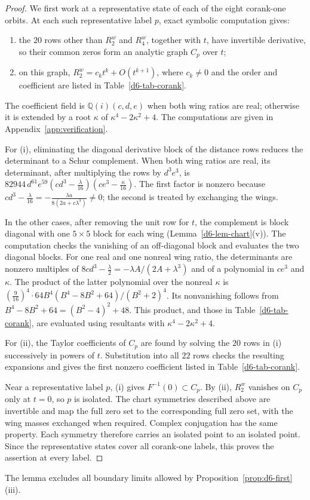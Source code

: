 \documentclass[Threeside,11pt]{article}
\theoremstyle{definition}
\theoremstyle{remark}
\numberwithin{equation}{section}
\theoremstyle{remark}
\newenvironment{romanlist}{\begin{enumerate}\renewcommand{\labelenumi}{(\roman{enumi})}%
  \renewcommand{\theenumi}{\roman{enumi}}}{\end{enumerate}}
\begin{document}
{
\begin{proof}
We first work at a representative state of each of the eight corank-one orbits.
At each such representative label $p$, exact symbolic computation gives:
\begin{romanlist}
  \item the $20$ rows other than $R^w_2$ and $R^w_4$, together with $t$, have
  invertible derivative, so their common zeros form an analytic graph $C_p$ over $t$;
  \item on this graph, $R^w_2=c_kt^k+O(t^{k+1})$, where $c_k\ne0$ and the
  order and coefficient are listed in Table~\ref{d6-tab-corank}.
\end{romanlist}
The coefficient field is $\mathbb Q(i)(c,d,e)$ when both wing ratios are real;
otherwise it is extended by a root $\kappa$ of $\kappa^4-2\kappa^2+4$.
The computations are given in Appendix~\ref{app:verification}.

For (i), eliminating the diagonal derivative block of the distance rows
reduces the determinant to a Schur complement.
When both wing ratios are real, its determinant, after multiplying the
rows by $d^3e^3$, is
$82944\,d^{61}e^{59}(cd^3-\frac{\lambda}{16})(ce^3-\frac{\kappa}{16})$.
The first factor is nonzero because
$cd^3-\frac{\lambda}{16}=-\frac{\lambda a}{8(2a+c\lambda^3)}\ne0$;
the second is treated by exchanging the wings.

In the other cases, after removing the unit row for $t$, the complement
is block diagonal with one $5\times5$ block for each wing
(Lemma~\ref{d6-lem-chart}(v)).  The computation checks the vanishing of an
off-diagonal block and evaluates the two diagonal blocks.
For one real and one nonreal wing ratio, the determinants are nonzero
multiples of $8cd^3-\frac{\lambda}{2}=-\lambda A/(2A+\lambda^3)$ and of
a polynomial in $ce^3$ and $\kappa$.  The product of the latter polynomial
over the nonreal $\kappa$ is
$(\frac9{16})^4\cdot64B^4(B^4-8B^2+64)/(B^2+2)^4$.
Its nonvanishing follows from $B^4-8B^2+64=(B^2-4)^2+48$.
This product, and those in Table~\ref{d6-tab-corank}, are evaluated using
resultants with $\kappa^4-2\kappa^2+4$.

For (ii), the Taylor coefficients of $C_p$ are found by solving the
$20$ rows in (i) successively in powers of $t$.  Substitution into all
$22$ rows checks the resulting expansions and gives the first nonzero
coefficient listed in Table~\ref{d6-tab-corank}.

Near a representative label $p$, (i) gives $F^{-1}(0)\subset C_p$.
By (ii), $R^w_2$ vanishes on $C_p$ only at $t=0$, so $p$ is isolated.
The chart symmetries described above are invertible and map the full zero set
to the corresponding full zero set, with the wing masses exchanged when required.
Complex conjugation has the same property. Each symmetry therefore carries an
isolated point to an isolated point. Since the representative states cover all
corank-one labels, this proves the assertion at every label.
\end{proof}

The lemma excludes all boundary limits allowed by
Proposition~\ref{prop:d6-first}(iii).
}
\end{document}
